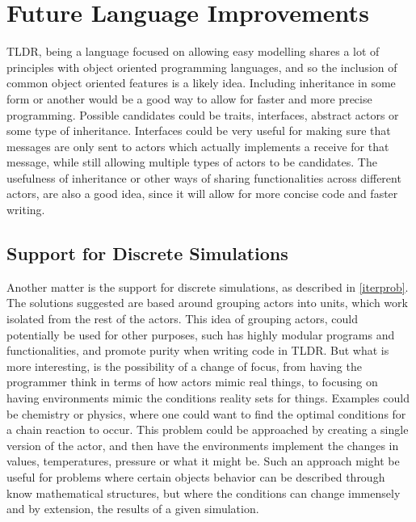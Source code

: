 \section{Future Language Improvements}

TLDR, being a language focused on allowing easy modelling shares a lot of principles with object oriented programming languages, and so the inclusion of common object oriented features is a likely idea. Including inheritance in some form or another would be a good way to allow for faster and more precise programming. Possible candidates could be traits, interfaces, abstract actors or some type of inheritance. Interfaces could be very useful for making sure that messages are only sent to actors which actually implements a receive for that message, while still allowing multiple types of actors to be candidates. The usefulness of inheritance or other ways of sharing functionalities across different actors, are also a good idea, since it will allow for more concise code and faster writing.

\subsection{Support for Discrete Simulations}

Another matter is the support for discrete simulations, as described in \cref{iterprob}. The solutions suggested are based around grouping actors into units, which work isolated from the rest of the actors. This idea of grouping actors, could potentially be used for other purposes, such has highly modular programs and functionalities, and promote purity when writing code in TLDR. But what is more interesting, is the possibility of a change of focus, from having the programmer think in terms of how actors mimic real things, to focusing on having environments mimic the conditions reality sets for things. Examples could be chemistry or physics, where one could want to find the optimal conditions for a chain reaction to occur. This problem could be approached by creating a single version of the actor, and then have the environments implement the changes in values, temperatures, pressure or what it might be. Such an approach might be useful for problems where certain objects behavior can be described through know mathematical structures, but where the conditions can change immensely and by extension, the results of a given simulation.